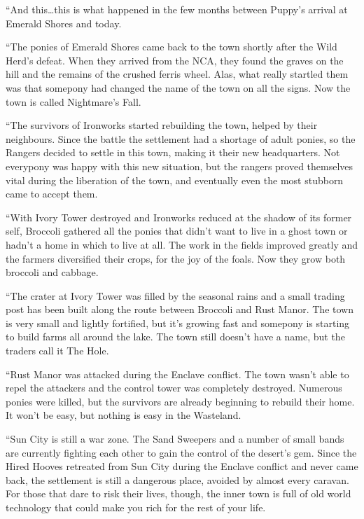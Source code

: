 {``And this\dots this is what happened in the few months between Puppy's arrival at Emerald Shores and today.

``The ponies of Emerald Shores came back to the town shortly after the Wild Herd's defeat. When they arrived from the NCA, they found the graves on the hill and the remains of the crushed ferris wheel. Alas, what really startled them was that somepony had changed the name of the town on all the signs. Now the town is called Nightmare's Fall.

``The survivors of Ironworks started rebuilding the town, helped by their neighbours. Since the battle the settlement had a shortage of adult ponies, so the Rangers decided to settle in this town, making it their new headquarters. Not everypony was happy with this new situation, but the rangers proved themselves vital during the liberation of the town, and eventually even the most stubborn came to accept them.

``With Ivory Tower destroyed and Ironworks reduced at the shadow of its former self, Broccoli gathered all the ponies that didn't want to live in a ghost town or hadn't a home in which to live at all. The work in the fields improved greatly and the farmers diversified their crops, for the joy of the foals. Now they grow both broccoli and cabbage.

``The crater at Ivory Tower was filled by the seasonal rains and a small trading post has been built along the route between Broccoli and Rust Manor. The town is very small and lightly fortified, but it's growing fast and somepony is starting to build farms all around the lake. The town still doesn't have a name, but the traders call it The Hole.

``Rust Manor was attacked during the Enclave conflict. The town wasn't able to repel the attackers and the control tower was completely destroyed. Numerous ponies were killed, but the survivors are already beginning to rebuild their home. It won't be easy, but nothing is easy in the Wasteland.

``Sun City is still a war zone. The Sand Sweepers and a number of small bands are currently fighting each other to gain the control of the desert's gem. Since the Hired Hooves retreated from Sun City during the Enclave conflict and never came back, the settlement is still a dangerous place, avoided by almost every caravan. For those that dare to risk their lives, though, the inner town is full of old world technology that could make you rich for the rest of your life.

}
